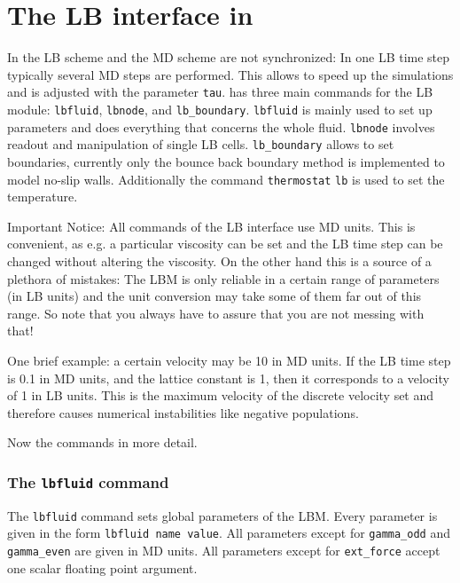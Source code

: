 

\chapter{The LB interface in \ES{}}
In \ES{} the LB scheme and the MD scheme are not synchronized: In one
LB time step typically several MD steps are performed. This allows to speed
up the simulations and is adjusted with the parameter \lstinline|tau|.
\ES{} has three main commands for the LB module: 
 \lstinline|lbfluid|,  \lstinline|lbnode|, and  \lstinline|lb_boundary|.
 \lstinline|lbfluid| is mainly used to set up parameters and does everything that
concerns the whole fluid.  \lstinline|lbnode| involves readout and manipulation of
single LB cells.  \lstinline|lb_boundary| allows to set boundaries, currently only
the bounce back boundary method is implemented to model
no-slip walls. Additionally the command  \lstinline|thermostat| \lstinline|lb| is used to set
the temperature. 

Important Notice: All commands of the LB interface use
MD units. This is convenient, as e.g. a particular 
viscosity can be set and the LB time step can be changed without
altering the viscosity. On the other hand this is a source
of a plethora of mistakes: The LBM is only reliable in a certain 
range of parameters (in LB units) and the unit conversion
may take some of them far out of this range. So note that you always
have to assure that you are not messing with that!

One brief example: a certain velocity may be 10 in MD units.
If the LB time step is 0.1 in MD units, and the lattice constant
is 1, then it corresponds to a velocity of 1 in LB units. 
This is the maximum velocity of the discrete velocity set and therefore
causes numerical instabilities like negative populations.

Now the commands in more detail.

\subsection*{The \lstinline|lbfluid| command}
The \lstinline{lbfluid} command sets global parameters of the LBM. Every
parameter is given in the form \lstinline|lbfluid name value|. 
All parameters except for \lstinline|gamma_odd| and  \lstinline|gamma_even|
are given in MD units. All parameters except for \lstinline|ext_force| accept
one scalar floating point argument. \\

